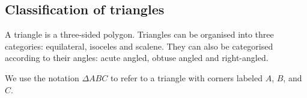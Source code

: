         \subsection*{Classification of triangles}
        \nopagebreak
        \label{m38380*id317485}A triangle is a three-sided polygon. Triangles can be organised into three categories: equilateral, isoceles and scalene. They can also be categorised according to their angles: acute angled, obtuse angled and right-angled. \par 
\label{m38380*id317683}We use the notation $\Delta ABC$ to
refer to a triangle with corners labeled \begin{math}A\end{math},
\begin{math}B\end{math}, and \begin{math}C\end{math}.\par 
